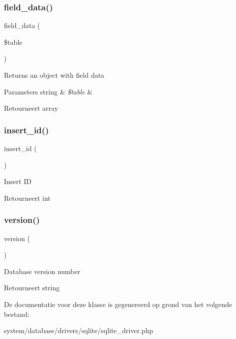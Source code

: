 \subsubsection{\texorpdfstring{field\_data()}{field\_data()}}
{\footnotesize\ttfamily field\+\_\+data (\begin{DoxyParamCaption}\item[{}]{\$table }\end{DoxyParamCaption})}

Returns an object with field data


\begin{DoxyParams}[1]{Parameters}
string & {\em \$table} & \\
\hline
\end{DoxyParams}
\begin{DoxyReturn}{Retourneert}
array 
\end{DoxyReturn}
\mbox{\label{class_c_i___d_b__sqlite__driver_a933f2cde8dc7f87875e257d0a4902e99}} 
\subsubsection{\texorpdfstring{insert\_id()}{insert\_id()}}
{\footnotesize\ttfamily insert\+\_\+id (\begin{DoxyParamCaption}{ }\end{DoxyParamCaption})}

Insert ID

\begin{DoxyReturn}{Retourneert}
int 
\end{DoxyReturn}
\mbox{\label{class_c_i___d_b__sqlite__driver_a6080dae0886626b9a4cedb29240708b1}} 
\subsubsection{\texorpdfstring{version()}{version()}}
{\footnotesize\ttfamily version (\begin{DoxyParamCaption}{ }\end{DoxyParamCaption})}

Database version number

\begin{DoxyReturn}{Retourneert}
string 
\end{DoxyReturn}


De documentatie voor deze klasse is gegenereerd op grond van het volgende bestand\+:\begin{DoxyCompactItemize}
\item 
system/database/drivers/sqlite/sqlite\+\_\+driver.\+php\end{DoxyCompactItemize}
